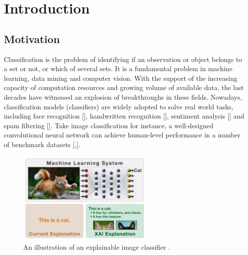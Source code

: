 \chapter{Introduction}\label{sec-introduction}
\section{Motivation}


Classification is the problem of identifying if an observation or object belongs to a set or not, or which of several sets. It is a fundamental problem in machine learning, data mining and computer vision. With the support of the increasing capacity of computation resources and growing volume of available data, the last decades have witnessed an explosion of breakthroughs in these fields. Nowadays, classification models (classifiers) are widely adopted to solve real world tasks, including face recognition [], handwritten recognition [], sentiment analysis [] and spam filtering []. Take image classification for instance, a well-designed convolutional neural network can achieve human-level performance in a number of benchmark datasets [,]. 


\begin{figure}[hb]
  \centering
  \includegraphics[width=0.6\textwidth]{figure/explain_cat}
  \caption{An illustration of an explainable image classifier \cite{darpa2017xai}.}
  \label{fig:explain-cat}
\end{figure}


